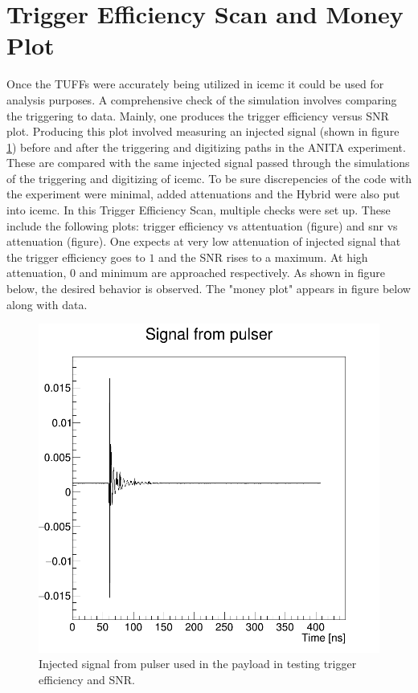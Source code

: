 \documentclass[12pt]{article}
\theoremstyle{plain}
\theoremstyle{definition}
\begin{document}
\section{Trigger Efficiency Scan and Money Plot}
\hspace{0.20in}
Once the TUFFs were accurately being utilized in icemc it could be used for analysis purposes. A comprehensive check of the simulation involves comparing the triggering to data. Mainly, one produces the trigger efficiency versus SNR plot. Producing this plot involved measuring an injected signal (shown in figure \ref{fig:signal}) before and after the triggering and digitizing paths in the ANITA experiment. These are compared with the same injected signal passed through the simulations of the triggering and digitizing of icemc. To be sure discrepencies of the code with the experiment were minimal, added attenuations and the Hybrid were also put into icemc. In this Trigger Efficiency Scan, multiple checks were set up. These include the following plots: trigger efficiency vs attentuation (figure) and snr vs attenuation (figure). One expects at very low attenuation of injected signal that the trigger efficiency goes to $1$ and the SNR rises to a maximum. At high attenuation, $0$ and minimum are approached respectively. As shown in figure below, the desired behavior is observed. The "money plot" appears in figure below along with data. 
\begin{figure}
\centering
	\includegraphics[scale=0.25]{"signal_from_pulser/pulser_signal_for_trigeffscan"}
	\caption{Injected signal from pulser used in the payload in testing trigger efficiency and SNR.}
	\label{fig:signal}
\end{figure}
%
 
 
\end{document}

